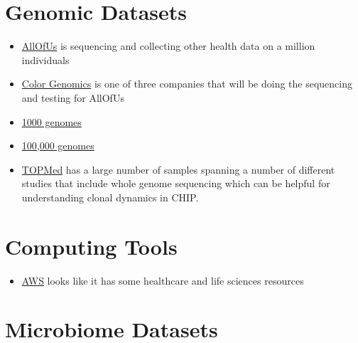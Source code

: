 \documentclass[]{book}
\providecommand{\tightlist}{%
  \setlength{\itemsep}{0pt}\setlength{\parskip}{0pt}}
\begin{document}
\hypertarget{genomic-datasets}{%
\section{Genomic Datasets}\label{genomic-datasets}}

\begin{itemize}
\tightlist
\item
  \href{ttps://www.joinallofus.org/en/how-to-join}{AllOfUs} is sequencing and collecting other health data on a million individuals
\item
  \href{https://www.color.com/}{Color Genomics} is one of three companies that will be doing the sequencing and testing for AllOfUs
\item
  \href{http://www.internationalgenome.org/data/}{1000 genomes}
\item
  \href{https://www.genomicsengland.co.uk/}{100,000 genomes}
\item
  \href{https://www.nhlbiwgs.org/\#Whole\%20Genome\%20Sequencing}{TOPMed} has a large number of samples spanning a number of different studies that include whole genome sequencing which can be helpful for understanding clonal dynamics in CHIP.
\end{itemize}

\hypertarget{computing-tools}{%
\section{Computing Tools}\label{computing-tools}}

\begin{itemize}
\tightlist
\item
  \href{https://aws.amazon.com/health/}{AWS} looks like it has some healthcare and life sciences resources
\end{itemize}

\hypertarget{microbiome-datasets}{%
\section{Microbiome Datasets}\label{microbiome-datasets}}
\end{document}
